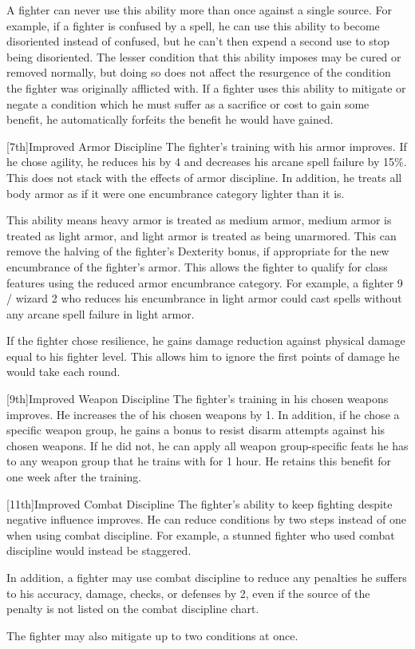 \par A fighter can never use this ability more than once against a single source.
For example, if a fighter is confused by a  spell, he can use this ability to become disoriented instead of confused, but he can't then expend a second use to stop being disoriented.
The lesser condition that this ability imposes may be cured or removed normally, but doing so does not affect the resurgence of the condition the fighter was originally afflicted with.
If a fighter uses this ability to mitigate or negate a condition which he must suffer as a sacrifice or cost to gain some benefit, he automatically forfeits the benefit he would have gained.

[7th]{Improved Armor Discipline}
The fighter's training with his armor improves.
If he chose agility, he reduces his  by 4 and decreases his arcane spell failure by 15\%.
This does not stack with the effects of armor discipline.
In addition, he treats all body armor as if it were one encumbrance category lighter than it is.
\par This ability means heavy armor is treated as medium armor, medium armor is treated as light armor, and light armor is treated as being unarmored.
This can remove the halving of the fighter's Dexterity bonus, if appropriate for the new encumbrance of the fighter's armor.
This allows the fighter to qualify for class features using the reduced armor encumbrance category.
For example, a fighter 9 / wizard 2 who reduces his encumbrance in light armor could cast spells without any arcane spell failure in light armor.

If the fighter chose resilience, he gains damage reduction against physical damage equal to his fighter level. This allows him to ignore the first points of damage he would take each round.

[9th]{Improved Weapon Discipline}
The fighter's training in his chosen weapons improves.
He increases the  of his chosen weapons by 1.
In addition, if he chose a specific weapon group, he gains a  bonus to resist disarm attempts against his chosen weapons.
If he did not, he can apply all weapon group-specific feats he has to any weapon group that he trains with for 1 hour.
He retains this benefit for one week after the training.

[11th]{Improved Combat Discipline}
The fighter's ability to keep fighting despite negative influence improves.
He can reduce conditions by two steps instead of one when using combat discipline.
For example, a stunned fighter who used combat discipline would instead be staggered.
\par In addition, a fighter may use combat discipline to reduce any penalties he suffers to his accuracy, damage, checks, or defenses by 2, even if the source of the penalty is not listed on the combat discipline chart.
\par The fighter may also mitigate up to two conditions at once.

